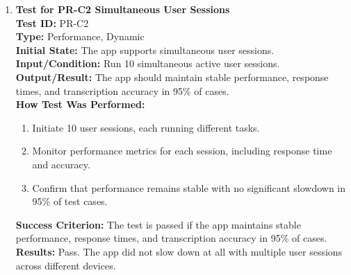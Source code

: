 \documentclass[12pt, titlepage]{article}
\begin{document}
\begin{enumerate}
    \item \textbf{Test for PR-C2 Simultaneous User Sessions} \\
      \newline
      \textbf{Test ID:} PR-C2 \\
      \textbf{Type:} Performance, Dynamic \\
      \textbf{Initial State:} The app supports simultaneous user sessions. \\
      \textbf{Input/Condition:} Run 10 simultaneous active user sessions. \\
      \textbf{Output/Result:} The app should maintain stable performance, response times, and transcription accuracy in 
      95\% of cases. \\
      \textbf{How Test Was Performed:}
      \begin{enumerate}
          \item Initiate 10 user sessions, each running different tasks.
          \item Monitor performance metrics for each session, including response time and accuracy.
          \item Confirm that performance remains stable with no significant slowdown in 95\% of test cases.
      \end{enumerate}
      \textbf{Success Criterion:} The test is passed if the app maintains stable performance, response times, and transcription accuracy in 95\% of cases.\\
      \textbf{Results:} Pass. The app did not slow down at all with multiple user sessions across different devices.\\


\end{enumerate}
\end{document}

